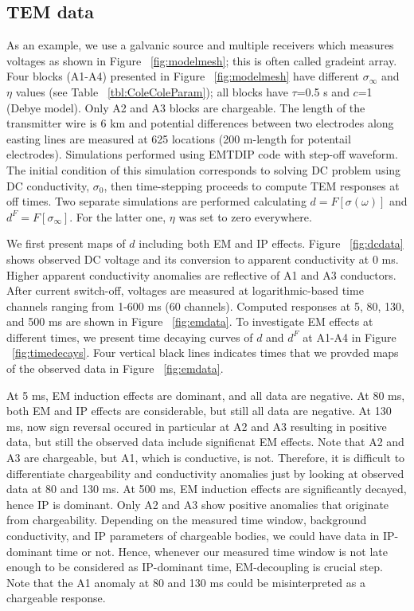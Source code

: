 \documentclass[paper]{geophysics}
\newcommand{\siginf}{\sigma_\infty}
\begin{document}
\subsection{TEM data}
As an example, we use a galvanic source and multiple receivers which measures voltages as shown in Figure ~\ref{fig:modelmesh}; this is often called gradeint array. Four blocks (A1-A4) presented in Figure ~\ref{fig:modelmesh} have different $\siginf$ and $\eta$ values (see Table ~\ref{tbl:ColeColeParam}); all blocks have  $\tau$=0.5 s and $c$=1  (Debye model). Only A2 and A3 blocks are chargeable. The length of the transmitter wire is 6 km and potential differences between two electrodes along easting lines are measured at 625 locations (200 m-length for potentail electrodes). Simulations performed using EMTDIP code \cite[]{Marchant2014} with step-off waveform. The initial condition of this simulation corresponds to solving DC problem using DC conductivity, $\sigma_0$, then time-stepping proceeds to compute TEM responses at off times. Two separate simulations are performed calculating $d=F[\sigma(\omega)]$ and $d^F=F[\siginf]$. For the latter one, $\eta$ was set to zero everywhere.

We first present maps of $d$ including both EM and IP effects. Figure ~\ref{fig:dcdata} shows observed DC voltage and its conversion to apparent conductivity at 0 ms.
Higher apparent conductivity anomalies are reflective of A1 and A3 conductors. After current switch-off, voltages are measured at logarithmic-based time channels ranging from 1-600 ms (60 channels). Computed responses at 5, 80, 130, and 500 ms are shown in Figure ~\ref{fig:emdata}. To investigate EM effects at different times, we present time decaying curves of $d$ and $d^F$ at A1-A4 in Figure ~\ref{fig:timedecays}. Four vertical black lines indicates times that we provded maps of the observed data in Figure ~\ref{fig:emdata}.

At 5 ms, EM induction effects are dominant, and all data are negative. At 80 ms, both EM and IP effects are considerable, but still all data are negative. At 130 ms, now sign reversal occured in particular at A2 and A3 resulting in positive data, but still the observed data include significnat EM effects.
Note that A2 and A3 are chargeable, but A1, which is conductive, is not. Therefore, it is difficult to differentiate chargeability and conductivity anomalies just by looking at observed data at 80 and 130 ms. At 500 ms, EM induction effects are significantly decayed, hence IP is dominant. Only A2 and A3 show positive anomalies that originate from chargeability. Depending on the measured time window, background conductivity, and IP parameters of chargeable bodies, we could have data in IP-dominant time or not. Hence, whenever our measured time window is not late enough to be considered as IP-dominant time, EM-decoupling is crucial step. Note that the A1 anomaly at 80 and 130 ms could be misinterpreted as a chargeable response.
\end{document}
